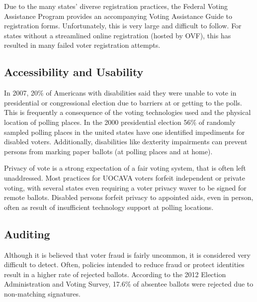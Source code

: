 
Due to the many states' diverse registration practices, the Federal Voting
Assistance Program provides an accompanying Voting Assistance Guide to
registration forms. Unfortunately, this is very large and difficult to follow.
For states without a streamlined online registration (hosted by OVF), this has
resulted in many failed voter registration attempts.


\subsection{Accessibility and Usability}

In 2007, 20\% of Americans with disabilities said they were unable to vote in
presidential or congressional election due to barriers at or getting to the
polls. This is frequently a consequence of the voting technologies used and the
physical location of polling places. In the 2000 presidential election 56\% of
randomly sampled polling places in the united states have one identified
impediments for disabled voters. Additionally, disabilities like dexterity
impairments can prevent persons from marking paper ballots (at polling places
and at home).

Privacy of vote is a strong expectation of a fair voting system, that is often
left unaddressed. Most practices for UOCAVA voters forfeit independent or
private voting, with several states even requiring a voter privacy waver to be
signed for remote ballots. Disabled persons forfeit privacy to appointed aids,
even in person, often as result of insufficient technology support at polling
locations. 


\subsection{Auditing}
Although it is believed that voter fraud is fairly uncommon, it is considered
very difficult to detect. Often, policies intended to reduce fraud or protect
identities result in a higher rate of rejected ballots. According to the 2012
Election Administration and Voting Survey, 17.6\% of absentee ballots were
rejected due to non-matching signatures.

